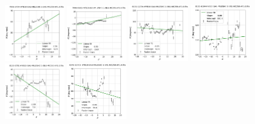 \documentclass[fleqn,usenatbib]{mnras}
\begin{document}
\begin{figure}
    \centering
    \includegraphics[width=0.23\textwidth]{Images/LINFITS/CC1-7958-3704-LINFIT-EBARS-MASKED.png}
    \includegraphics[width=0.23\textwidth]{Images/LINFITS/CC1-7990-9102-LINFIT-EBARS-MASKED.png}
    \includegraphics[width=0.23\textwidth]{Images/LINFITS/CC1-8131-12704-LINFIT-EBARS-MASKED.png}
    \includegraphics[width=0.23\textwidth]{Images/LINFITS/CC1-8131-6104-LINFIT-EBARS-MASKED.png}
    \includegraphics[width=0.23\textwidth]{Images/LINFITS/CC1-8133-3701-LINFIT-EBARS-MASKED.png}
    \includegraphics[width=0.23\textwidth]{Images/LINFITS/CC1-8241-12702-LINFIT-EBARS-MASKED.png}

\end{figure}
\end{document}
